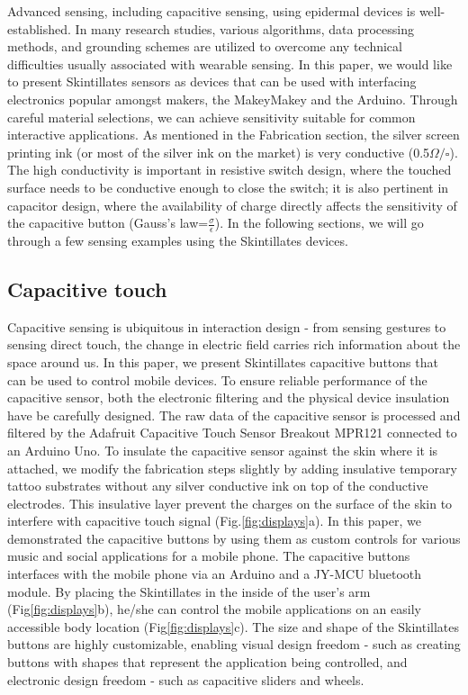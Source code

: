 \documentclass{sigchi}
\begin{document}
Advanced sensing, including capacitive sensing, using epidermal devices is well-established. In many research studies, various algorithms, data processing methods, and grounding schemes are utilized to overcome any technical difficulties usually associated with wearable sensing. In this paper, we would like to present Skintillates sensors as devices that can be used with interfacing electronics popular amongst makers, the MakeyMakey and the Arduino. Through careful material selections, we can achieve sensitivity suitable for common interactive applications. As mentioned in the Fabrication section, the silver screen printing ink (or most of the silver ink on the market) is very conductive (0.5$\Omega/\square$). 
 The high conductivity is important in resistive switch design, where the touched surface needs to be conductive enough to close the switch; it is also pertinent in capacitor design, where the availability of charge directly affects the sensitivity of the capacitive button (Gauss’s law=$\frac{\sigma}{\epsilon}$). In the following sections, we will go through a few sensing examples using the Skintillates devices. 

\subsection {Capacitive touch}

Capacitive sensing is ubiquitous in interaction design - from sensing gestures to sensing direct touch, the change in electric field carries rich information about the space around us. In this paper, we present Skintillates capacitive buttons that can be used to control mobile devices. To ensure reliable performance of the capacitive sensor, both the electronic filtering and the physical device insulation have be carefully designed. The raw data of the capacitive sensor is processed and filtered by the Adafruit Capacitive Touch Sensor Breakout MPR121 connected to an Arduino Uno. To insulate the capacitive sensor against the skin where it is attached, we modify the fabrication steps slightly by adding insulative temporary tattoo substrates without any silver conductive ink on top of the conductive electrodes. This insulative layer prevent the charges on the surface of the skin to interfere with capacitive touch signal (Fig.\ref{fig:displays}a). In this paper, we demonstrated the capacitive buttons by using them as custom controls for various music and social applications for a mobile phone. The capacitive buttons interfaces with the mobile phone via an Arduino and a JY-MCU bluetooth module. By placing the Skintillates in the inside of the user's arm (Fig\ref{fig:displays}b), he/she can control the mobile applications on an easily accessible body location (Fig\ref{fig:displays}c). The size and shape of the Skintillates buttons are highly customizable, enabling visual design freedom - such as creating buttons with shapes that represent the application being controlled, and electronic design freedom - such as capacitive sliders and wheels. 
\end{document}
